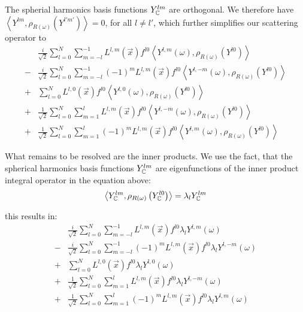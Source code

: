 \documentclass[10pt]{scrartcl}
\begin{document}
The spherial harmonics basis functions $Y_{\mathbb{C}}^{lm}$ are orthogonal. We therefore have $\left < Y^{lm}, \rho_{R(\omega)}\left(Y^{l'm'}\right) \right > = 0$, for all $l\ne l'$, which further simplifies our scattering operator to
\begin{align}
&
\frac{i}{\sqrt{2}}
\sum_{l=0}^{N}{
\sum_{m=-l}^{-1}{
L^{{l,m}}\left (\vec{x} \right )
f^{l0}
\left<
Y^{l, m}(\omega )
, \rho_{R\left(\omega\right)}
\left(
Y^{l0}
\right)
\right>
}
}
\\
-
&
\frac{i}{\sqrt{2}}
\sum_{l=0}^{N}{
\sum_{m=-l}^{-1}{
\left({-1}\right)^{m}
L^{{l,m}}\left (\vec{x} \right )
f^{l0}
\left<
Y^{l, -m}(\omega )
, \rho_{R\left(\omega\right)}
\left(
Y^{l0}
\right)
\right>
}
}
\\
+
&
\sum_{l=0}^{N}{
L^{{l,0}}\left (\vec{x} \right )
f^{l0}
\left<
Y^{l, 0}(\omega )
, \rho_{R\left(\omega\right)}
\left(
Y^{l0}
\right)
\right>
}
\\
+
&
\frac{1}{\sqrt{2}}
\sum_{l=0}^{N}{
\sum_{m=1}^{l}{
L^{{l,m}}\left (\vec{x} \right )
f^{l0}
\left<
Y^{l, -m}(\omega )
, \rho_{R\left(\omega\right)}
\left(
Y^{l0}
\right)
\right>
}
}
\\
+
&
\frac{1}{\sqrt{2}}
\sum_{l=0}^{N}{
\sum_{m=1}^{l}{
\left({-1}\right)^{m}
L^{{l,m}}\left (\vec{x} \right )
f^{l0}
\left<
Y^{l, m}(\omega )
, \rho_{R\left(\omega\right)}
\left(
Y^{l0}
\right)
\right>
}
}
\end{align}

What remains to be resolved are the inner products. We use the fact, that the spherical harmonics basis functions $ Y_{\mathbb{C}}^{lm}$ are eigenfunctions of the inner product integral operator in the equation above:
\begin{align}
\left < Y_{\mathbb{C}}^{lm}, \rho_{R(\omega)}\left ( Y_{\mathbb{C}}^{l0} \right )\right > = \lambda_l Y_{\mathbb{C}}^{lm}
\end{align}

this results in:
\begin{align}
&
\frac{i}{\sqrt{2}}
\sum_{l=0}^{N}{
\sum_{m=-l}^{-1}{
L^{{l,m}}\left (\vec{x} \right )
f^{l0}
\lambda_l
Y^{l, m}(\omega )
}
}
\\
-
&
\frac{i}{\sqrt{2}}
\sum_{l=0}^{N}{
\sum_{m=-l}^{-1}{
\left({-1}\right)^{m}
L^{{l,m}}\left (\vec{x} \right )
f^{l0}
\lambda_l
Y^{l, -m}(\omega )
}
}
\\
+
&
\sum_{l=0}^{N}{
L^{{l,0}}\left (\vec{x} \right )
f^{l0}
\lambda_l
Y^{l, 0}(\omega )
}
\\
+
&
\frac{1}{\sqrt{2}}
\sum_{l=0}^{N}{
\sum_{m=1}^{l}{
L^{{l,m}}\left (\vec{x} \right )
f^{l0}
\lambda_l
Y^{l, -m}(\omega )
}
}
\\
+
&
\frac{1}{\sqrt{2}}
\sum_{l=0}^{N}{
\sum_{m=1}^{l}{
\left({-1}\right)^{m}
L^{{l,m}}\left (\vec{x} \right )
f^{l0}
\lambda_l
Y^{l, m}(\omega )
}
}
\end{align}
\end{document}
